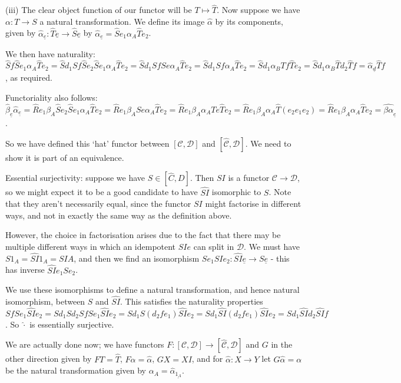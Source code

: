 \documentclass[]{article}
\theoremstyle{custhm}
\theoremstyle{cusdef}
\theoremstyle{custhm}
\theoremstyle{custhm}
\theoremstyle{custhm}
\theoremstyle{custhm}
\theoremstyle{cusdef}
\theoremstyle{remark}
\newcommand{\ra}{\rightarrow}
\begin{document}
(iii) The clear object function of our functor will be $T\mapsto \widehat{T}$. Now suppose we have $\alpha:T\ra S$ a natural transformation. We define its image $\widehat{\alpha}$ by its components, given by $\widehat{\alpha}_{\underline{e}}: \widehat{T}\underline{e}\ra\widehat{S}\underline{e}$ by $\widehat{\alpha}_{\underline{e}} = \widehat{S}e_1\alpha_A\widehat{T}e_2$.

We then have naturality: $\widehat{S}f\widehat{S}e_1\alpha_A\widehat{T}e_2 = \hat{S}d_1Sf\hat{S}e_2\widehat{S}e_1\alpha_A\widehat{T}e_2 = \widehat{S}d_1 Sf Se\alpha_A\widehat{T}e_2 = \widehat{S}d_1Sf\alpha_A\widehat{T}e_2 = \widehat{S}d_1\alpha_BTf\widehat{T}e_2 = \widehat{S}d_1\alpha_B \widehat{T}d_2\widehat{T}f = \widehat{\alpha}_{\underline{d}}\widehat{T}f$, as required.

Functoriality also follows: $\widehat{\beta}_{\underline{e}}\widehat{\alpha}_{\underline{e}} = \widehat{R}e_1\beta_A\widehat{S}e_2\widehat{S}e_1\alpha_A\widehat{T}e_2 = \widehat{R}e_1\beta_ASe\alpha_A\widehat{T}e_2 = \widehat{R}e_1\beta_A\alpha_ATe\widehat{T}e_2 = \widehat{R} e_1\beta_A\alpha_A \widehat{T}(e_2e_1e_2) = \widehat{R}e_1\beta_A\alpha_A\widehat{T}e_2 = \widehat{\beta\alpha}_{\underline{e}}$.

So we have defined this `hat' functor between $[\mathcal{C},\mathcal{D}]$ and $[\widehat{\mathcal{C}},\mathcal{D}]$. We need to show it is part of an equivalence.

Essential surjectivity: suppose we have $S\in [\widehat{C},D]$. Then $SI$ is a functor $\mathcal{C}\ra\mathcal{D}$, so we might expect it to be a good candidate to have $\widehat{SI}$ isomorphic to $S$. Note that they aren't necessarily equal, since the functor $SI$ might factorise in different ways, and not in exactly the same way as the definition above.

However, the choice in factorisation arises due to the fact that there may be multiple different ways in which an idempotent $SIe$ can split in $\mathcal{D}$. We must have $S1_A = \widehat{SI}1_A = SIA$, and then we find an isomorphism $Se_1\widehat{SI}e_2 : \widehat{SI}\underline{e}\ra S\underline{e}$ - this has inverse $\widehat{SI}e_1Se_2$.

We use these isomorphisms to define a natural transformation, and hence natural isomorphism, between $S$ and $\widehat{SI}$. This satisfies the naturality properties $SfSe_1\widehat{SI}e_2 =Sd_1Sd_2SfSe_1\widehat{SI}e_2 = Sd_1S(d_2fe_1)\widehat{SI}e_2 = Sd_1\widehat{SI}(d_2fe_1)\widehat{SI}e_2 = Sd_1\widehat{SI}d_2 \widehat{SI}f$. So $\widehat{\cdot}$ is essentially surjective.

We are actually done now; we have functors $F:[\mathcal{C},\mathcal{D}] \ra [\widehat{\mathcal{C}},\mathcal{D}]$ and $G$ in the other direction given by $FT = \widehat{T}$, $F\alpha = \widehat{\alpha}$, $GX = XI$, and for $\widehat{\alpha}:X\ra Y$ let $G\widehat{\alpha} = \alpha$ be the natural transformation given by $\alpha_A = \widehat{\alpha}_{\underline{1_A}}$.
\end{document}
